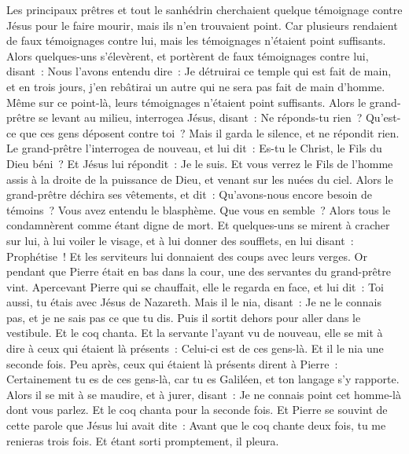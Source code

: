 \begin{multicols}{2}
Les principaux prêtres et tout le sanhédrin cherchaient quelque témoignage contre Jésus pour le faire mourir, mais ils n'en trouvaient point.
Car plusieurs rendaient de faux témoignages contre lui, mais les témoignages n'étaient point suffisants.
Alors quelques-uns s'élevèrent, et portèrent de faux témoignages contre lui, disant~:
Nous l'avons entendu dire~: Je détruirai ce temple qui est fait de main, et en trois jours, j'en rebâtirai un autre qui ne sera pas fait de main d'homme.
Même sur ce point-là, leurs témoignages n'étaient point suffisants.
Alors le grand-prêtre se levant au milieu, interrogea Jésus, disant~: Ne réponds-tu rien~? Qu'est-ce que ces gens déposent contre toi~?
Mais il garda le silence, et ne répondit rien. Le grand-prêtre l'interrogea de nouveau, et lui dit~: Es-tu le Christ, le Fils du Dieu béni~?
Et Jésus lui répondit~: Je le suis. Et vous verrez le Fils de l'homme assis à la droite de la puissance de Dieu, et venant sur les nuées du ciel.
Alors le grand-prêtre déchira ses vêtements, et dit~: Qu'avons-nous encore besoin de témoins~?
Vous avez entendu le blasphème. Que vous en semble~? Alors tous le condamnèrent comme étant digne de mort.
Et quelques-uns se mirent à cracher sur lui, à lui voiler le visage, et à lui donner des soufflets, en lui disant~: Prophétise~! Et les serviteurs lui donnaient des coups avec leurs verges.
Or pendant que Pierre était en bas dans la cour, une des servantes du grand-prêtre vint.
Apercevant Pierre qui se chauffait, elle le regarda en face, et lui dit~: Toi aussi, tu étais avec Jésus de Nazareth.
Mais il le nia, disant~: Je ne le connais pas, et je ne sais pas ce que tu dis. Puis il sortit dehors pour aller dans le vestibule. Et le coq chanta.
Et la servante l'ayant vu de nouveau, elle se mit à dire à ceux qui étaient là présents~: Celui-ci est de ces gens-là. Et il le nia une seconde fois.
Peu après, ceux qui étaient là présents dirent à Pierre~: Certainement tu es de ces gens-là, car tu es Galiléen, et ton langage s'y rapporte.
Alors il se mit à se maudire, et à jurer, disant~: Je ne connais point cet homme-là dont vous parlez.
Et le coq chanta pour la seconde fois. Et Pierre se souvint de cette parole que Jésus lui avait dite~: Avant que le coq chante deux fois, tu me renieras trois fois. Et étant sorti promptement, il pleura.

\end{multicols}
